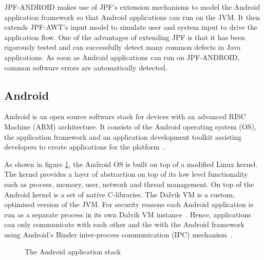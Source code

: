 \documentclass{acm_proc_article-sp}
\begin{document}
JPF-ANDROID makes use of JPF's extension mechanisms to model the Android application framework so that Android applications can run on the
JVM. It then extends JPF-AWT's input model to simulate user and system input to drive the application flow. One of the advantages of
extending JPF is that it has been rigorously tested and can successfully detect many common defects in Java applications. As soon as Android
applications can run on JPF-ANDROID, common software errors are automatically detected.


\subsection{Android}
Android is an open source software stack for devices with an advanced RISC Machine (ARM) architecture.
It consists of the Android operating system (OS), the application framework and an application development toolkit assisting developers to create
applications for the platform~\cite{AndroidDocs}.

As shown in figure \ref{fig:android}, the Android OS is built on top of a modified Linux kernel. The kernel provides a layer of abstraction
on top of its low level functionality such as process, memory, user, network and thread management. On top of the Android kernel is a set of
native C-libraries. The Dalvik VM is a custom, optimised version of the JVM. For security reasons each Android application is run as a
separate process in its own Dalvik VM instance~\cite{AndroidSecurity}.  Hence, applications can only communicate with each other and the
with the Android framework using Android's Binder inter-process communication (IPC) mechanism~\cite{Binder}. 

\begin{figure}
\centering
{}
\caption{The Android application stack~\cite{systemserver}}
\label{fig:android}
\end{figure}
\end{document}
